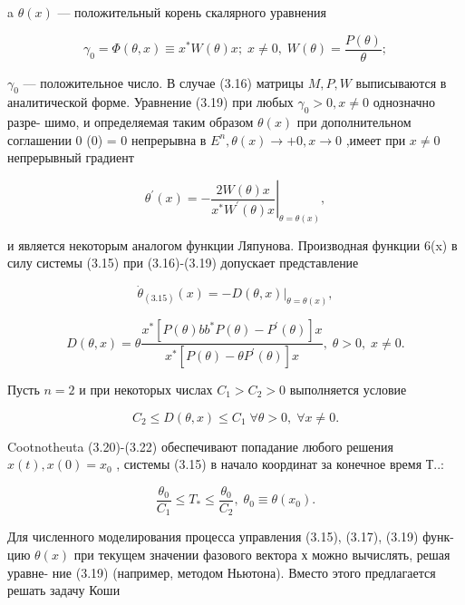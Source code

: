 \documentclass[10pt]{article}
\begin{document}
a \(\theta \left( x\right)\) — положительный корень скалярного уравнения

\[
{\gamma }_{0} = \Phi \left( {\theta ,x}\right)  \equiv  {x}^{ * }W\left( \theta \right) x;\;x \neq  0,\;W\left( \theta \right)  = \frac{P\left( \theta \right) }{\theta }; \tag{3.19}
\]

\({\gamma }_{0}\) — положительное число. В случае (3.16) матрицы \(M,P,W\) выписываются в аналитической форме. Уравнение (3.19) при любых \({\gamma }_{0} > 0,x \neq  0\) однозначно разре- шимо, и определяемая таким образом \(\theta \left( x\right)\) при дополнительном соглашении 0 (0) = 0 непрерывна в \({E}^{n},\theta \left( x\right)  \rightarrow   + 0,x \rightarrow  0\) ,имеет при \(x \neq  0\) непрерывный градиент

\[
{\theta }^{\prime }\left( x\right)  =  - {\left. \frac{{2W}\left( \theta \right) x}{{x}^{ * }{W}^{\prime }\left( \theta \right) x}\right| }_{\theta  = \theta \left( x\right) },
\]

и является некоторым аналогом функции Ляпунова. Производная функции 6(x) в силу системы (3.15) при (3.16)-(3.19) допускает представление

\[
{\dot{\theta }}_{\left( {3.15}\right) }\left( x\right)  =  - {\left. D\left( \theta ,x\right) \right| }_{\theta  = \theta \left( x\right) }, \tag{3.20}
\]

\[
D\left( {\theta ,x}\right)  = \theta \frac{{x}^{ * }\left[  {P\left( \theta \right) b{b}^{ * }P\left( \theta \right)  - {P}^{\prime }\left( \theta \right) }\right]  x}{{x}^{ * }\left[  {P\left( \theta \right)  - \theta {P}^{\prime }\left( \theta \right) }\right]  x},\;\theta  > 0,\;x \neq  0. \tag{3.21}
\]

Пусть \(n = 2\) и при некоторых числах \({C}_{1} > {C}_{2} > 0\) выполняется условие

\[
{C}_{2} \leq  D\left( {\theta ,x}\right)  \leq  {C}_{1}\;\forall \theta  > 0,\;\forall x \neq  0. \tag{3.22}
\]

Cootnotheuta (3.20)-(3.22) обеспечивают попадание любого решения \(x\left( t\right) ,x\left( 0\right)  = {x}_{0}\) , системы (3.15) в начало координат за конечное время Т..:

\[
\frac{{\theta }_{0}}{{C}_{1}} \leq  {T}_{ * } \leq  \frac{{\theta }_{0}}{{C}_{2}},\;{\theta }_{0} \equiv  \theta \left( {x}_{0}\right) . \tag{3.23}
\]

Для численного моделирования процесса управления (3.15), (3.17), (3.19) функ- цию \(\theta \left( x\right)\) при текущем значении фазового вектора х можно вычислять, решая уравне- ние (3.19) (например, методом Ньютона). Вместо этого предлагается решать задачу Коши
\end{document}
